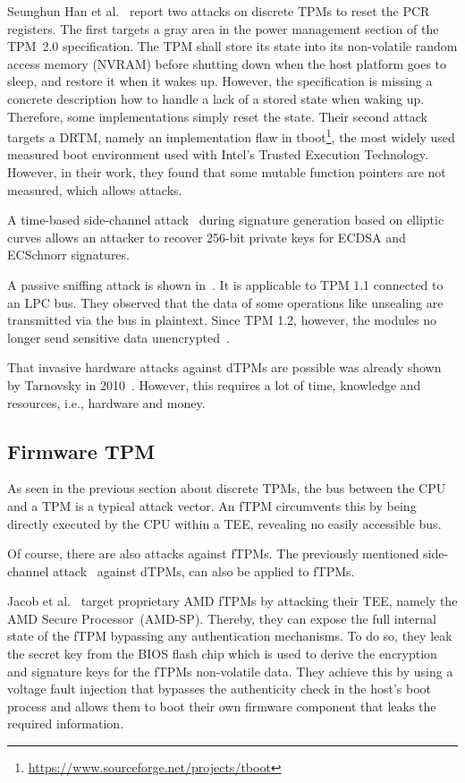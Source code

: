 Seunghun Han et al.~\cite{aBadDream} report two attacks on discrete TPMs to reset the PCR registers.
The first targets a gray area in the power management section of the TPM~2.0 specification.
The TPM shall store its state into its non-volatile random access memory (NVRAM) before shutting down when the host platform goes to sleep, and restore it when it wakes up.
However, the specification is missing a concrete description how to handle a lack of a stored state when waking up.
Therefore, some implementations simply reset the state.
Their second attack targets a \ac{DRTM}, namely an implementation flaw in tboot\footnote{\url{https://www.sourceforge.net/projects/tboot}}, the most widely used measured boot environment used with Intel's Trusted Execution Technology.
However, in their work, they found that some mutable function pointers are not measured, which allows attacks.

A time-based side-channel attack~\cite{Moghimi2019} during signature generation based on elliptic curves allows an attacker to recover 256-bit private keys for ECDSA and ECSchnorr signatures.

A passive sniffing attack is shown in~\cite{Kursawe2005AnalyzingTP}.
It is applicable to TPM 1.1 connected to an LPC bus.
They observed that the data of some operations like unsealing are transmitted via the bus in plaintext.
Since TPM 1.2, however, the modules no longer send sensitive data unencrypted~\cite{Winter2013}.

That invasive hardware attacks against dTPMs are possible was already shown by Tarnovsky in 2010~\cite{tarnovsky}.
However, this requires a lot of time, knowledge and resources, i.e., hardware and money.

\subsection{Firmware TPM}

As seen in the previous section about discrete TPMs, the bus between the CPU and a TPM is a typical attack vector.
An fTPM circumvents this by being directly executed by the CPU within a \ac{TEE}, revealing no easily accessible bus.

Of course, there are also attacks against fTPMs.
The previously mentioned side-channel attack~\cite{Moghimi2019} against dTPMs, can also be applied to fTPMs.

Jacob et al.~\cite{Jacob2023} target proprietary AMD fTPMs by attacking their \ac{TEE}, namely the AMD Secure Processor~(AMD-SP).
Thereby, they can expose the full internal state of the fTPM bypassing any authentication mechanisms.
To do so, they leak the secret key from the BIOS flash chip which is used to derive the encryption and signature keys for the fTPMs non-volatile data.
They achieve this by using a voltage fault injection that bypasses the authenticity check in the host's boot process and allows them to boot their own firmware component that leaks the required information.

